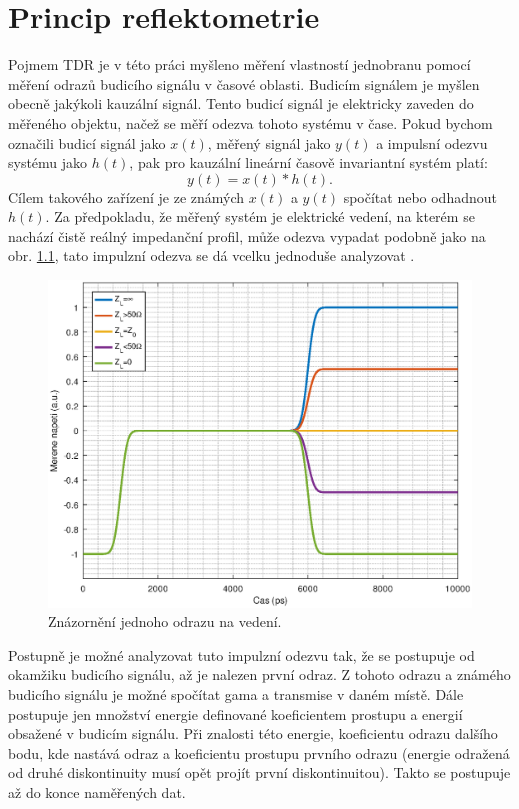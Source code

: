 \chapter{Princip reflektometrie}

Pojmem \acrfull{TDR} je v této práci myšleno měření vlastností jednobranu pomocí měření odrazů budicího signálu v časové oblasti. Budicím signálem je myšlen obecně jakýkoli kauzální signál. Tento budicí signál je elektricky zaveden do měřeného objektu, načež se měří odezva tohoto systému v čase.
Pokud bychom označili budicí signál jako $x(t)$, měřený signál jako $y(t)$ a impulsní odezvu systému jako $h(t)$, pak pro kauzální lineární časově invariantní systém platí:
\begin{equation}
y(t)=x(t) \ast h(t).
\end{equation}
Cílem takového zařízení je ze známých $x(t)$ a $y(t)$ spočítat nebo odhadnout $h(t)$. Za předpokladu, že měřený systém je elektrické vedení, na kterém se nachází čistě reálný impedanční profil, může odezva vypadat podobně jako na obr. \ref{simpleresponse}, tato impulzní odezva se dá vcelku jednoduše analyzovat \cite{broadbandreflectometry}.

\begin{figure}[htbp]\includegraphics[width=\textwidth,keepaspectratio]{images/onereflectionsample.eps}\caption{Znázornění jednoho odrazu na vedení.}\label{simpleresponse}\end{figure}

Postupně je možné analyzovat tuto impulzní odezvu tak, že se postupuje od okamžiku budicího signálu, až je nalezen první odraz. Z tohoto odrazu a známého budicího signálu je možné spočítat \gls{gama} a \gls{transmise} v daném místě. Dále postupuje jen množství energie definované koeficientem prostupu a energií obsažené v budicím signálu. Při znalosti této energie, koeficientu odrazu dalšího bodu, kde nastává odraz a koeficientu prostupu prvního odrazu (energie odražená od druhé diskontinuity musí opět projít první diskontinuitou). Takto se postupuje až do konce naměřených dat.


